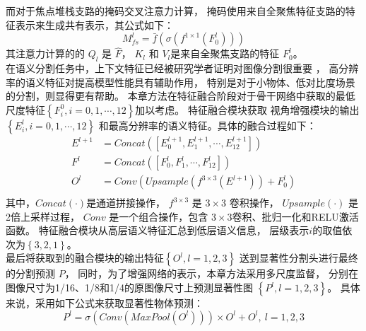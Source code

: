 \indent 
而对于焦点堆栈支路的掩码交叉注意力计算，
掩码使用来自全聚焦特征支路的特征表示来生成共有表示，其公式如下：
%
%
%
%
\begin{equation}
	M_{fs}^{l} = \bar{f}   \left ( \sigma \left ( 
	f^{1\times 1}
	\left ( 
	F_{0}^{l}
	\right ) 
	\right )   \right ) 
\end{equation}
%
%
%
%
其注意力计算的的 $Q_{l}$ 是  $ \hat{F}$，
$K_{l}$ 
和
$V_{l}$是来自全聚焦支路的特征 $F_{0}^{l}$。\\
%
%
%
%
\indent
在语义分割任务中，上下文特征已经被研究学者证明对图像分割很重要
，
高分辨率的语义特征对提高模型性能具有辅助作用，
特别是对于小物体、低对比度场景的分割，则显得更有帮助。
本章方法在特征融合阶段对于骨干网络中获取的最低尺度特征$\left \{ F_{i}^{0}, i = 0, 1, \cdots, 12 \right \}$加以考虑。
特征融合模块获取
视角增强模块的输出$\left \{ E_{i}^{l}, i = 0, 1, \cdots, 12 \right \}$
和最高分辨率的语义特征。具体的融合过程如下：
%
%
\begin{equation}
	\begin{aligned}
		E^{l+1} &= 
		Concat\left ( \left [ E_{0}^{l+1},E_{1}^{l+1},\cdots, E_{12}^{l+1} \right ]  \right )  
		\\  
		F^{l} &= 
		Concat\left ( \left [ F_{0}^{l},F_{1}^{l},\cdots, F_{12}^{l} \right ]  \right )  
		\\  
		{O^{l}}  &= Conv\left (  Upsample\left ( f^{3 \times 3} \left ( E^{l+1} \right )  \right ) + F_{0}^{l} \right )  \\
	\end{aligned}
\end{equation}
%
%
其中，$Concat(\cdot)$是通道拼接操作，
$f^{3 \times 3}$ 是 $3 \times 3 $ 卷积操作，
$ Upsample(\cdot) $ 是2倍上采样过程，
$ Conv $ 是一个组合操作，包含 $3\times 3$卷积、批归一化和RELU激活函数。
特征融合模块从高层语义特征汇总到低层语义信息，
层级表示$i$的取值依次为$\left \{ 3,2,1 \right \}$。\\
%
%
%
%
\indent
最后将获取到的融合模块的输出特征$\left \{ O^{l}, l = 1,2,3 \right \}$
送到显著性分割头进行最终的分割预测 $P$，
同时，为了增强网络的表示，本章方法采用多尺度监督，
分别在图像尺寸为1/16、1/8和1/4的原图像尺寸上预测显著性图
$\left \{ P^{l}, l = 1,2,3 \right \}$。
具体来说，采用如下公式来获取显著性物体预测：
%
%
\begin{equation}
	P^{l} = \sigma \left ( Conv\left ( MaxPool \left (  
	O^{l} \right )  \right )  \right ) 
	\times 
	O^{l} + O^{l},~ l = 1,2,3
\end{equation}
